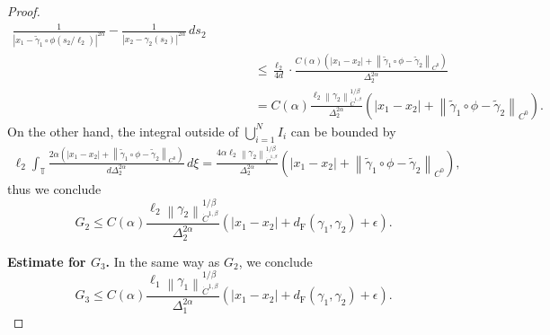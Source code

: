 \documentclass[reqno,centertags,12pt]{amsart}
\theoremstyle{definition}
\numberwithin{equation}{section}
\newcommand{\abs}[1]{\left\lvert#1\right\rvert}
\newcommand{\norm}[1]{\left\|#1\right\|}
\newcommand{\bbT}{{\mathbb{T}}}
\begin{document}
\begin{proof}
\begin{align*}
{            \frac{1}{\abs{x_{1} - \tilde{\gamma}_{1}\circ\phi(s_{2}/\ell_{2})}^{2\alpha}}
            - \frac{1}{\abs{x_{2} - \gamma_{2}(s_{2})}^{2\alpha}}
        }\,ds_{2}
        \\&\quad\quad\quad\leq
        \frac{\ell_{2}}{4d}\cdot
        \frac{C(\alpha)\left(
            \abs{x_{1} - x_{2}}
            + \norm{\tilde{\gamma}_{1}\circ\phi - \tilde{\gamma}_{2}}_{C^{0}}
        \right)}
        {\Delta_{2}^{2\alpha}}
        \\&\quad\quad\quad=
        C(\alpha)\frac{\ell_{2}\norm{\gamma_{2}}_{\dot{C}^{1,\beta}}^{1/\beta}}
        {\Delta_{2}^{2\alpha}}
        \left(
            \abs{x_{1} - x_{2}}
            + \norm{\tilde{\gamma}_{1}\circ\phi - \tilde{\gamma}_{2}}_{C^{0}}
        \right).
    \end{align*}
    On the other hand, the integral outside of $\bigcup_{i=1}^{N}I_{i}$ can be bounded by
    \begin{align*}
        \ell_{2}\int_{\bbT}
        \frac{2\alpha\left(
            \abs{x_{1} - x_{2}}
            + \norm{\tilde{\gamma}_{1}\circ\phi - \tilde{\gamma}_{2}}_{C^{0}}
        \right)}
        {d\Delta_{2}^{2\alpha}}\,d\xi
        = \frac{4\alpha\ell_{2}\norm{\gamma_{2}}_{\dot{C}^{1,\beta}}^{1/\beta}}
        {\Delta_{2}^{2\alpha}}
        \left(
            \abs{x_{1} - x_{2}}
            + \norm{\tilde{\gamma}_{1}\circ\phi - \tilde{\gamma}_{2}}_{C^{0}}
        \right),
    \end{align*}
    thus we conclude
    \[
        G_{2} \leq C(\alpha)
        \frac{\ell_{2}\norm{\gamma_{2}}_{\dot{C}^{1,\beta}}^{1/\beta}}
        {\Delta_{2}^{2\alpha}}
        \left(\abs{x_{1}-x_{2}} + d_{\mathrm{F}}(\gamma_{1},\gamma_{2}) + \epsilon\right).
    \]

    \textbf{Estimate for $G_{3}$.} In the same way as $G_{2}$, we conclude
    \[
        G_{3} \leq C(\alpha)
        \frac{\ell_{1}\norm{\gamma_{1}}_{\dot{C}^{1,\beta}}^{1/\beta}}
        {\Delta_{1}^{2\alpha}}
        \left(\abs{x_{1}-x_{2}} + d_{\mathrm{F}}(\gamma_{1},\gamma_{2}) + \epsilon\right).
    \]


\end{proof}
\end{document}
